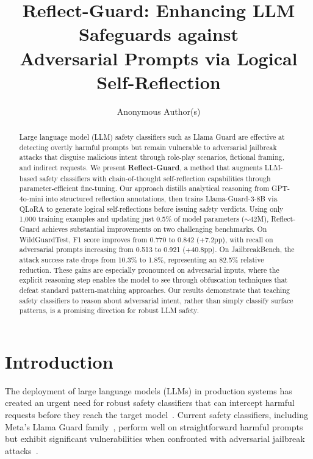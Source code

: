\documentclass[11pt]{article}
\title{Reflect-Guard: Enhancing LLM Safeguards against\\Adversarial Prompts via Logical Self-Reflection}
\author{Anonymous Author(s)}
\begin{document}
\maketitle

\begin{abstract}
Large language model (LLM) safety classifiers such as Llama Guard are effective at detecting overtly harmful prompts but remain vulnerable to adversarial jailbreak attacks that disguise malicious intent through role-play scenarios, fictional framing, and indirect requests. We present \textbf{Reflect-Guard}, a method that augments LLM-based safety classifiers with chain-of-thought self-reflection capabilities through parameter-efficient fine-tuning. Our approach distills analytical reasoning from GPT-4o-mini into structured reflection annotations, then trains Llama-Guard-3-8B via QLoRA to generate logical self-reflections before issuing safety verdicts. Using only 1{,}000 training examples and updating just 0.5\% of model parameters ($\sim$42M), Reflect-Guard achieves substantial improvements on two challenging benchmarks. On WildGuardTest, F1 score improves from 0.770 to 0.842 (+7.2pp), with recall on adversarial prompts increasing from 0.513 to 0.921 (+40.8pp). On JailbreakBench, the attack success rate drops from 10.3\% to 1.8\%, representing an 82.5\% relative reduction. These gains are especially pronounced on adversarial inputs, where the explicit reasoning step enables the model to see through obfuscation techniques that defeat standard pattern-matching approaches. Our results demonstrate that teaching safety classifiers to reason about adversarial intent, rather than simply classify surface patterns, is a promising direction for robust LLM safety.
\end{abstract}

\section{Introduction}

The deployment of large language models (LLMs) in production systems has created an urgent need for robust safety classifiers that can intercept harmful requests before they reach the target model~\citep{inan2023llamaguard, han2024wildguard}. Current safety classifiers, including Meta's Llama Guard family~\citep{inan2023llamaguard, metallamaguard3}, perform well on straightforward harmful prompts but exhibit significant vulnerabilities when confronted with adversarial jailbreak attacks~\citep{chao2023jailbreaking, zou2023universal, liu2024autodan}.
\end{document}
